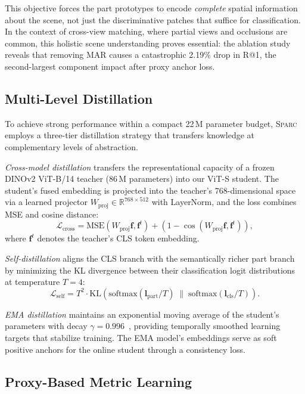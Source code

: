 \documentclass[sigconf, anonymous, review]{acmart}
\newcommand{\ours}{\textsc{Sparc}}
\newcommand{\reals}{\mathbb{R}}
\newcommand{\loss}{\mathcal{L}}
\begin{document}
This objective forces the part prototypes to encode \emph{complete} spatial information about the scene, not just the discriminative patches that suffice for classification.
In the context of cross-view matching, where partial views and occlusions are common, this holistic scene understanding proves essential: the ablation study reveals that removing MAR causes a catastrophic 2.19\% drop in R@1, the second-largest component impact after proxy anchor loss.

\subsection{Multi-Level Distillation}
\label{sec:distill}

To achieve strong performance within a compact 22\,M parameter budget, \ours{} employs a three-tier distillation strategy that transfers knowledge at complementary levels of abstraction.

\emph{Cross-model distillation} transfers the representational capacity of a frozen DINOv2 ViT-B/14 teacher (86\,M parameters) into our ViT-S student.
The student's fused embedding is projected into the teacher's 768-dimensional space via a learned projector $W_\text{proj} \in \reals^{768 \times 512}$ with LayerNorm, and the loss combines MSE and cosine distance:
\begin{equation}
\loss_\text{cross} = \text{MSE}(W_\text{proj}\mathbf{f}, \mathbf{f}^t) + (1 - \cos(W_\text{proj}\mathbf{f}, \mathbf{f}^t)),
\label{eq:crossdistill}
\end{equation}
where $\mathbf{f}^t$ denotes the teacher's CLS token embedding.

\emph{Self-distillation} aligns the CLS branch with the semantically richer part branch by minimizing the KL divergence between their classification logit distributions at temperature $T{=}4$:
\begin{equation}
\loss_\text{self} = T^2 \cdot \text{KL}\!\left(\text{softmax}(\mathbf{l}_\text{part}/T) \;\|\; \text{softmax}(\mathbf{l}_\text{cls}/T)\right).
\label{eq:selfdistill}
\end{equation}

\emph{EMA distillation} maintains an exponential moving average of the student's parameters with decay $\gamma{=}0.996$~\cite{tarvainen2017ema}, providing temporally smoothed learning targets that stabilize training.
The EMA model's embeddings serve as soft positive anchors for the online student through a consistency loss.

\subsection{Proxy-Based Metric Learning}
\label{sec:proxy}
\end{document}

